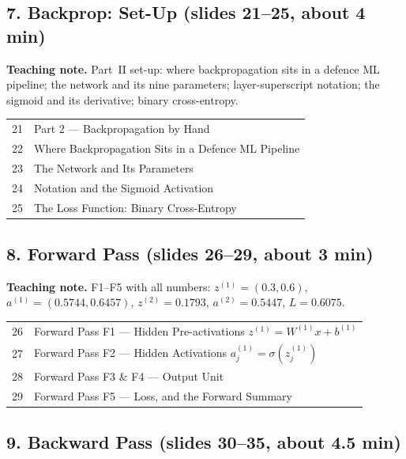 \documentclass[11pt]{article}
\begin{document}
\subsection{7. Backprop: Set-Up \normalfont\small\color{GreyN}(slides 21--25, about 4 min)}

\textbf{Teaching note.} Part~II set-up: where backpropagation sits in a defence ML pipeline; the network and its nine parameters; layer-superscript notation; the sigmoid and its derivative; binary cross-entropy.

\begin{center}\small\renewcommand{\arraystretch}{1.1}\begin{tabularx}{\textwidth}{@{}r X@{}}21 & Part 2 --- Backpropagation by Hand\\
22 & Where Backpropagation Sits in a Defence ML Pipeline\\
23 & The Network and Its Parameters\\
24 & Notation and the Sigmoid Activation\\
25 & The Loss Function: Binary Cross-Entropy\\\end{tabularx}\end{center}

\subsection{8. Forward Pass \normalfont\small\color{GreyN}(slides 26--29, about 3 min)}

\textbf{Teaching note.} F1--F5 with all numbers: $z^{(1)}=(0.3,0.6)$, $a^{(1)}=(0.5744,0.6457)$, $z^{(2)}=0.1793$, $a^{(2)}=0.5447$, $L=0.6075$.

\begin{center}\small\renewcommand{\arraystretch}{1.1}\begin{tabularx}{\textwidth}{@{}r X@{}}26 & Forward Pass F1 --- Hidden Pre-activations $z^{(1)}=W^{(1)}x+b^{(1)}$\\
27 & Forward Pass F2 --- Hidden Activations $a^{(1)}_j=\sigma(z^{(1)}_j)$\\
28 & Forward Pass F3 \& F4 --- Output Unit\\
29 & Forward Pass F5 --- Loss, and the Forward Summary\\\end{tabularx}\end{center}

\subsection{9. Backward Pass \normalfont\small\color{GreyN}(slides 30--35, about 4.5 min)}
\end{document}
